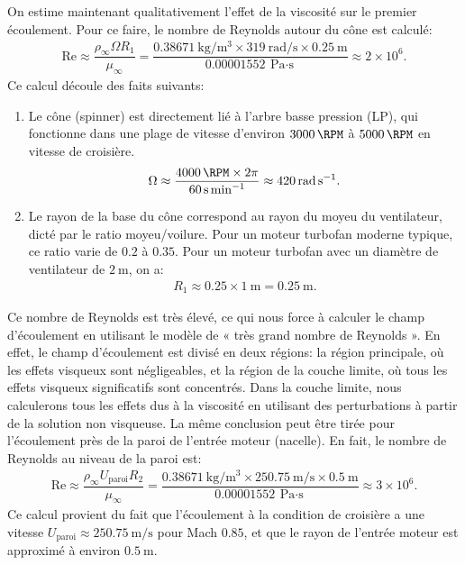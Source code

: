 \documentclass[12pt]{book}
\theoremstyle{bfnote}
\theoremstyle{bfnote}
\begin{document}
On estime maintenant qualitativement l'effet de la viscosité sur le premier écoulement. Pour ce faire, le nombre de Reynolds autour du cône est calculé:
\begin{align}
    \mathrm{Re} \approx \dfrac{\rho_{\infty} \Omega R_1}{\mu_{\infty}} = \dfrac{\SI{0.38671}{\kilogram\per\meter^3} \times \SI{319}{\radian\per\second} \times \SI{0.25}{\meter}}{\SI{0.00001552}{\pascal\cdot\second}} \approx 2 \times 10^6.
\end{align}
Ce calcul découle des faits suivants:
\begin{enumerate}
    \item Le cône (spinner) est directement lié à l'arbre basse pression (LP), qui fonctionne dans une plage de vitesse d'environ $\SI{3000}{\RPM}$ à $\SI{5000}{\RPM}$ en vitesse de croisière.
    \begin{align*}
        \Omega \approx \dfrac{\SI{4000}{\RPM} \times 2 \pi}{\SI{60}{\second\per\minute}} \approx \SI{420}{\radian\per\second}.
    \end{align*}
    \item Le rayon de la base du cône correspond au rayon du moyeu du ventilateur, dicté par le ratio moyeu/voilure. Pour un moteur turbofan moderne typique, ce ratio varie de $0.2$ à $0.35$. Pour un moteur turbofan avec un diamètre de ventilateur de $\SI{2}{\meter}$, on a:
    \begin{align*}
        R_1 \approx 0.25 \times \SI{1}{\meter} = \SI{0.25}{\meter}.
    \end{align*}
\end{enumerate}

Ce nombre de Reynolds est très élevé, ce qui nous force à calculer le champ d'écoulement en utilisant le modèle de « très grand nombre de Reynolds ». En effet, le champ d'écoulement est divisé en deux régions: la région principale, où les effets visqueux sont négligeables, et la région de la couche limite, où tous les effets visqueux significatifs sont concentrés. Dans la couche limite, nous calculerons tous les effets dus à la viscosité en utilisant des perturbations à partir de la solution non visqueuse. La même conclusion peut être tirée pour l'écoulement près de la paroi de l'entrée moteur (nacelle). En fait, le nombre de Reynolds au niveau de la paroi est:
\begin{align*}
    \mathrm{Re} \approx \dfrac{\rho_\infty U_{\text{paroi}} R_2}{\mu_\infty} = \dfrac{\SI{0.38671}{\kilogram\per\meter^3} \times \SI{250.75}{\meter\per\second} \times \SI{0.5}{\meter}}{\SI{0.00001552}{\pascal\cdot\second}} \approx 3 \times 10^6.
\end{align*}
Ce calcul provient du fait que l'écoulement à la condition de croisière a une vitesse $U_{\text{paroi}} \approx \SI{250.75}{\meter\per\second}$ pour Mach $0.85$, et que le rayon de l'entrée moteur est approximé à environ $\SI{0.5}{\meter}$.
\end{document}
